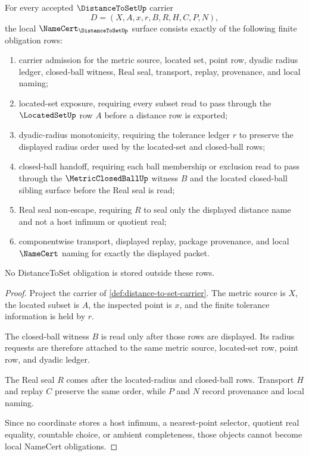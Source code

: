 \begin{theorem}
\label{thm:distance-to-set-namecert-obligations}
For every accepted $\DistanceToSetUp$ carrier
$$
D=(X,A,x,r,B,R,H,C,P,N),
$$
the local $\NameCert_{\DistanceToSetUp}$ surface consists exactly of the following finite obligation rows:
\begin{enumerate}
\item carrier admission for the metric source, located set, point row, dyadic radius ledger, closed-ball witness, Real seal, transport, replay, provenance, and local naming;
\item located-set exposure, requiring every subset read to pass through the $\LocatedSetUp$ row $A$ before a distance row is exported;
\item dyadic-radius monotonicity, requiring the tolerance ledger $r$ to preserve the displayed radius order used by the located-set and closed-ball rows;
\item closed-ball handoff, requiring each ball membership or exclusion read to pass through the $\MetricClosedBallUp$ witness $B$ and the located closed-ball sibling surface before the Real seal is read;
\item Real seal non-escape, requiring $R$ to seal only the displayed distance name and not a host infimum or quotient real;
\item componentwise transport, displayed replay, package provenance, and local $\NameCert$ naming for exactly the displayed packet.
\end{enumerate}
No DistanceToSet obligation is stored outside these rows.
\end{theorem}
\begin{proof}
Project the carrier of \autoref{def:distance-to-set-carrier}. The metric source is $X$, the located subset is $A$, the inspected point is $x$, and the finite tolerance information is held by $r$.

The closed-ball witness $B$ is read only after those rows are displayed. Its radius requests are therefore attached to the same metric source, located-set row, point row, and dyadic ledger.

The Real seal $R$ comes after the located-radius and closed-ball rows. Transport $H$ and replay $C$ preserve the same order, while $P$ and $N$ record provenance and local naming.

Since no coordinate stores a host infimum, a nearest-point selector, quotient real equality, countable choice, or ambient completeness, those objects cannot become local NameCert obligations.
\end{proof}

